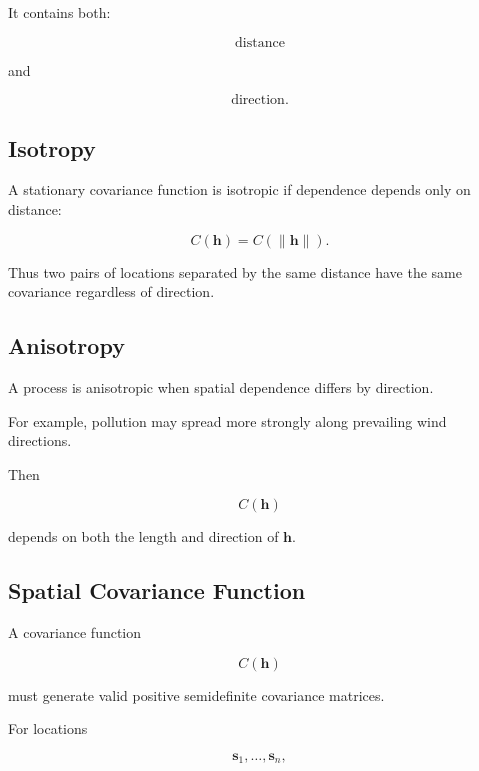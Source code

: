 It contains both:

\[
\boxed{
\text{distance}
}
\]

and

\[
\boxed{
\text{direction}.
}
\]

\subsection{Isotropy}
\label{subsec:spatial-isotropy}

A stationary covariance function is isotropic if dependence depends only
on distance:

\[
\boxed{
C(\mathbf{h})
=
C
(
\|\mathbf{h}\|
).
}
\]

Thus two pairs of locations separated by the same distance have the same
covariance regardless of direction.

\subsection{Anisotropy}
\label{subsec:spatial-anisotropy}

A process is anisotropic when spatial dependence differs by direction.

For example, pollution may spread more strongly along prevailing wind
directions.

Then

\[
\boxed{
C(\mathbf{h})
}
\]

depends on both the length and direction of \(\mathbf{h}\).

\subsection{Spatial Covariance Function}
\label{subsec:spatial-covariance-function}

A covariance function

\[
\boxed{
C(\mathbf{h})
}
\]

must generate valid positive semidefinite covariance matrices.

For locations

\[
\mathbf{s}_1,\ldots,\mathbf{s}_n,
\]

